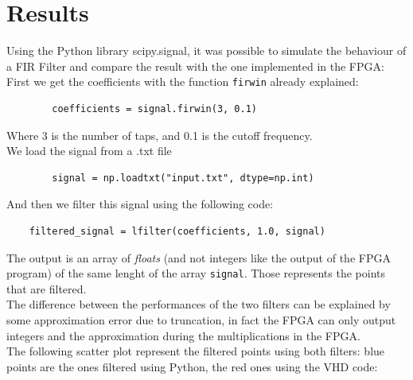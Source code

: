 \documentclass[11pt,a4paper,twocolumn]{IEEEtran}
\begin{document}
	\section{Results}
	Using the Python library scipy.signal, it was possible to simulate the behaviour of a FIR Filter and compare the result with the one implemented in the FPGA:\\
	First we get the coefficients with the function \texttt{firwin} already explained:
	\begin{lstlisting}
		coefficients = signal.firwin(3, 0.1)
	\end{lstlisting}
	Where 3 is the number of taps, and 0.1 is the cutoff frequency.\\
	We load the signal from a .txt file
	\begin{lstlisting}
		signal = np.loadtxt("input.txt", dtype=np.int)
	\end{lstlisting}
	And then we filter this signal using the following code:
	\begin{lstlisting}
	filtered_signal = lfilter(coefficients, 1.0, signal)
	\end{lstlisting}
	The output is an array of \emph{floats} (and not integers like the output of the FPGA program) of the same lenght of the array \texttt{signal}. Those represents the points that are filtered.\\
	The difference between the performances of the two filters can be explained by some approximation error due to truncation, in fact the FPGA can only output integers and the approximation during the multiplications in the FPGA.\\
	The following scatter plot represent the filtered points using both filters: blue points are the ones filtered using Python, the red ones using the VHD code:
	
\end{document}
